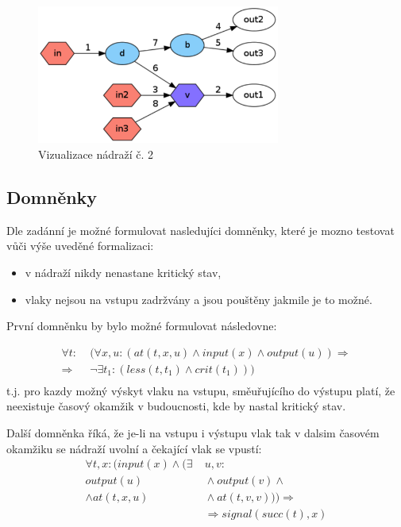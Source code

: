 \documentclass[a4paper,journal]{IEEEtran}
\begin{document}
\begin{figure}[!h] %
  \centering
  \includegraphics[width=80mm]{nadrazi1}
  \caption{Vizualizace nádraží č. 2}
  \label{fig:nad2}
\end{figure}

\subsection{Domněnky}
Dle zadánní je možné formulovat nasledujíci domněnky, které je mozno testovat vůči výše uveděné formalizaci:
\begin{itemize}
\item v nádraží nikdy nenastane kritický stav,
\item vlaky nejsou na vstupu zadržvány a jsou pouštěny jakmile je to možné.
\end{itemize}

První domněnku by bylo možné formulovat následovne:

\begin{equation}\label{eq:crit}
\begin{split}
\forall t:&\;(\forall x,u:(at(t,x,u) \wedge input(x) \wedge output(u)) \Rightarrow\\
\Rightarrow &\;\neg \exists t_1:(less(t,t_1) \wedge crit(t_1)))\\
\end{split}
\end{equation}
t.j. pro kazdy možný výskyt vlaku na vstupu, směuřujícího do výstupu platí, že neexistuje časový 
okamžik v budoucnosti, kde by nastal kritický stav.

Další domněnka říká, že je-li na vstupu i výstupu vlak tak v dalsim časovém okamžiku se nádraží uvolní
a čekající vlak se vpustí:
\begin{equation}\label{eq:crit}
\begin{split}
\forall t,x: (input(x) \wedge(\exists&\; u,v:\\
output(u) &\;\wedge output(v) \wedge\\
\wedge  at(t,x,u) &\;\wedge at(t,v,v) )) \Rightarrow \\
&\;\Rightarrow signal(succ(t),x)\\
\end{split}
\end{equation}
\end{document}
